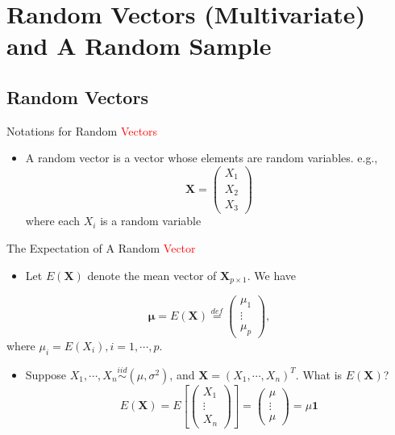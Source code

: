 \documentclass[
  ignorenonframetext,
]{beamer}
\providecommand{\tightlist}{%
  \setlength{\itemsep}{0pt}\setlength{\parskip}{0pt}}
\begin{document}
\hypertarget{random-vectors-multivariate-and-a-random-sample}{%
\section{Random Vectors (Multivariate) and A Random
Sample}\label{random-vectors-multivariate-and-a-random-sample}}

\hypertarget{random-vectors}{%
\subsection{Random Vectors}\label{random-vectors}}

\begin{frame}{Notations for Random \textcolor{red}{Vectors}}
\protect\hypertarget{notations-for-random}{}
\begin{itemize}
\tightlist
\item
  A random vector is a vector whose elements are random variables. e.g.,
  \[\mathbf{X} = \begin{pmatrix} X_1\\ X_2\\ X_3\end{pmatrix}\] where
  each \(X_i\) is a random variable
\end{itemize}
\end{frame}

\begin{frame}{The Expectation of A Random \textcolor{red}{Vector}}
\protect\hypertarget{the-expectation-of-a-random}{}
\begin{itemize}
\tightlist
\item
  Let \(E(\mathbf{X})\) denote the mean vector of
  \(\mathbf{X}_{p\times 1}\). We have
\end{itemize}

\[\boldsymbol \mu=E(\mathbf{X})\overset{def}=\begin{pmatrix}\mu_1\\ \vdots \\\mu_p \end{pmatrix}, \]
where \(\mu_i=E(X_i), i=1, \cdots, p\).

\begin{itemize}
\tightlist
\item
  Suppose \(X_1, \cdots, X_n \overset{iid} \sim (\mu, \sigma^2)\), and
  \(\mathbf X = (X_1, \cdots, X_n)^T\). What is \(E(\mathbf X)\)?
  \[E(\mathbf X)=E[\begin{pmatrix} X_1 \\ \vdots \\ X_n
  \end{pmatrix}] =
  \begin{pmatrix} \mu \\ \vdots\\ \mu \end{pmatrix}= \mu \mathbf 1\]
\end{itemize}
\end{frame}
\end{document}
